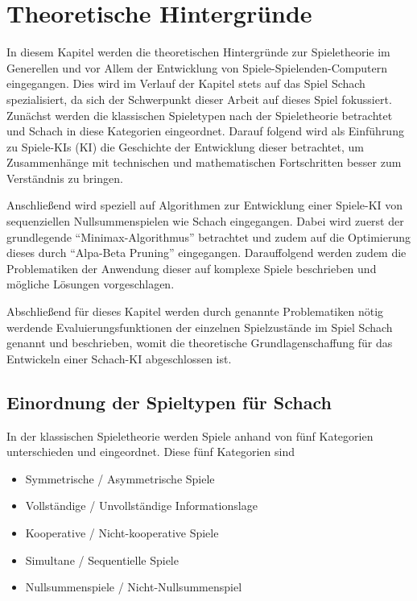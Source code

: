 
\chapter{Theoretische Hintergründe}\label{theoretische_hintergründe}
\nocite{*}

In diesem Kapitel werden die theoretischen Hintergründe zur Spieletheorie im Generellen und vor Allem der Entwicklung von Spiele-Spielenden-Computern eingegangen. Dies wird im Verlauf der Kapitel stets auf das Spiel Schach spezialisiert, da sich der Schwerpunkt dieser Arbeit auf dieses Spiel fokussiert. 
Zunächst werden die klassischen Spieletypen nach der Spieletheorie betrachtet und Schach in diese Kategorien eingeordnet. Darauf folgend wird als Einführung zu Spiele-\acs{KI}s (\acl{KI}) die Geschichte der Entwicklung dieser betrachtet, um Zusammenhänge mit technischen und mathematischen Fortschritten besser zum Verständnis zu bringen.

Anschließend wird speziell auf Algorithmen zur Entwicklung einer Spiele-KI von sequenziellen Nullsummenspielen wie Schach eingegangen. Dabei wird zuerst der grundlegende ``Minimax-Algorithmus'' betrachtet und zudem auf die Optimierung dieses durch ``Alpa-Beta Pruning'' eingegangen. Darauffolgend werden zudem die Problematiken der Anwendung dieser auf komplexe Spiele beschrieben und mögliche Lösungen vorgeschlagen. 

Abschließend für dieses Kapitel werden durch genannte Problematiken nötig werdende Evaluierungsfunktionen der einzelnen Spielzustände im Spiel Schach genannt und beschrieben, womit die theoretische Grundlagenschaffung für das Entwickeln einer Schach-KI abgeschlossen ist.

\section{Einordnung der Spieltypen für Schach} \label{game_types}

In der klassischen Spieletheorie werden Spiele anhand von fünf Kategorien unterschieden und eingeordnet. Diese fünf Kategorien sind
\begin{itemize}
\item Symmetrische / Asymmetrische Spiele
\item Vollständige / Unvollständige Informationslage
\item Kooperative / Nicht-kooperative Spiele
\item Simultane / Sequentielle Spiele
\item Nullsummenspiele / Nicht-Nullsummenspiel \cite{Rodriguez}
\end{itemize} 

